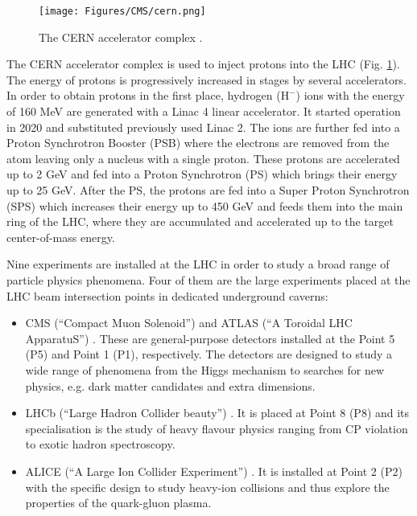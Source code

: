 \begin{figure}[h!]
    \centering
    \texttt{[image: Figures/CMS/cern.png]}
    \caption{The CERN accelerator complex \cite{Mobs:2684277}.}
    \label{fig:cern}
\end{figure}

The CERN accelerator complex is used to inject protons into the LHC (Fig. \ref{fig:cern}). The energy of protons is progressively increased in stages by several accelerators. In order to obtain protons in the first place, hydrogen ($\text{H}^{-}$) ions with the energy of 160 MeV are generated with a Linac 4 linear accelerator. It started operation in 2020 and substituted previously used Linac 2. The ions are further fed into a Proton Synchrotron Booster (PSB) where the electrons are removed from the atom leaving only a nucleus with a single proton. These protons are accelerated up to 2 GeV and fed into a Proton Synchrotron (PS) which brings their energy up to 25 GeV. After the PS, the protons are fed into a Super Proton Synchrotron (SPS) which increases their energy up to 450 GeV and feeds them into the main ring of the LHC, where they are accumulated and accelerated up to the target center-of-mass energy.  

Nine experiments are installed at the LHC in order to study a broad range of particle physics phenomena. Four of them are the large experiments placed at the LHC beam intersection points in dedicated underground caverns:  
\begin{itemize}
    \item CMS (\enquote{Compact Muon Solenoid}) \cite{CMS:2008xjf} and ATLAS (\enquote{A Toroidal LHC ApparatuS}) \cite{ATLAS:2008xda}. These are general-purpose detectors installed at the Point 5 (P5) and Point 1 (P1), respectively. The detectors are designed to study a wide range of phenomena from the Higgs mechanism to searches for new physics, e.g. dark matter candidates and extra dimensions.
    
    \item LHCb (\enquote{Large Hadron Collider beauty}) \cite{LHCb:2008vvz}. It is placed at Point 8 (P8) and its specialisation is the study of heavy flavour physics ranging from CP violation to exotic hadron spectroscopy.  
    
    \item ALICE (\enquote{A Large Ion Collider Experiment}) \cite{ALICE:2008ngc}. It is installed at Point 2 (P2) with the specific design to study heavy-ion collisions and thus explore the properties of the quark-gluon plasma.
\end{itemize}

